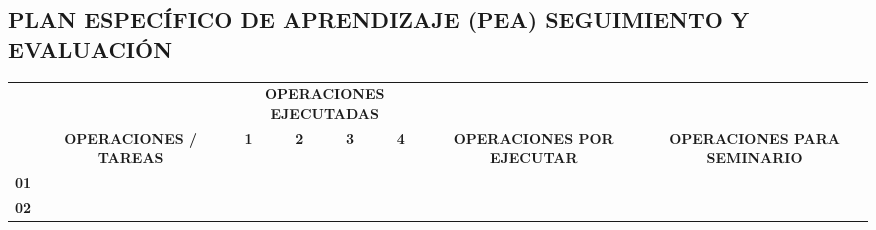 \begin{center}
    \section*{PLAN ESPECÍFICO DE APRENDIZAJE (PEA) SEGUIMIENTO Y EVALUACIÓN}
\end{center}

\begin{table}[ht]
    \begin{tabular}{|l|l|llll|l|l|}
    \hline
    \rowcolor[HTML]{C0C0C0} 
    \multicolumn{1}{|c|}{\cellcolor[HTML]{C0C0C0}}                              & \multicolumn{1}{c|}{\cellcolor[HTML]{C0C0C0}}                                                & \multicolumn{4}{c|}{\cellcolor[HTML]{C0C0C0}\textbf{OPERACIONES EJECUTADAS}}                                                                                                                                                          & \multicolumn{1}{c|}{\cellcolor[HTML]{C0C0C0}}                                                    & \multicolumn{1}{c|}{\cellcolor[HTML]{C0C0C0}}                                                      \\ \cline{3-6}
    \rowcolor[HTML]{C0C0C0} 
    \multicolumn{1}{|c|}{\multirow{-2}{*}{\cellcolor[HTML]{C0C0C0}\textbf{N°}}} & \multicolumn{1}{c|}{\multirow{-2}{*}{\cellcolor[HTML]{C0C0C0}\textbf{OPERACIONES / TAREAS}}} & \multicolumn{1}{c|}{\cellcolor[HTML]{C0C0C0}\textbf{1}} & \multicolumn{1}{c|}{\cellcolor[HTML]{C0C0C0}\textbf{2}} & \multicolumn{1}{c|}{\cellcolor[HTML]{C0C0C0}\textbf{3}} & \multicolumn{1}{c|}{\cellcolor[HTML]{C0C0C0}\textbf{4}} & \multicolumn{1}{c|}{\multirow{-2}{*}{\cellcolor[HTML]{C0C0C0}\textbf{OPERACIONES POR EJECUTAR}}} & \multicolumn{1}{c|}{\multirow{-2}{*}{\cellcolor[HTML]{C0C0C0}\textbf{OPERACIONES PARA SEMINARIO}}} \\ \hline
    \textbf{01}                                                                 &                                                                                              & \multicolumn{1}{l|}{}                                   & \multicolumn{1}{l|}{}                                   & \multicolumn{1}{l|}{}                                   &                                                         &                                                                                                  &                                                                                                    \\ \hline
    \textbf{02}                                                                 &                                                                                              & \multicolumn{1}{l|}{}                                   & \multicolumn{1}{l|}{}                                   & \multicolumn{1}{l|}{}                                   &                                                         &                                                                                                  &                                                                                                    \\ \hline

\end{tabular}
\end{table}
